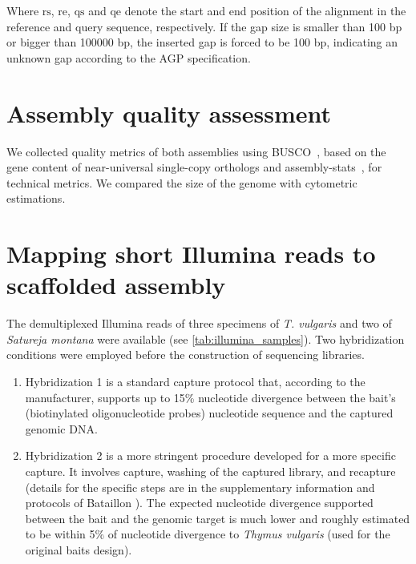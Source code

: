 Where $\textrm{rs}$, $\textrm{re}$, $\textrm{qs}$ and $\textrm{qe}$ denote the start and end position of the alignment in the reference and query sequence, respectively. If the gap size is smaller than 100 bp or bigger than 100000 bp, the inserted gap is forced to be 100 bp, indicating an unknown gap according to the AGP specification.\cite{AGPSpecificationV2} 

\section*{Assembly quality assessment}

We collected quality metrics of both assemblies using BUSCO~\cite{manniBUSCOAssessingGenomic2021}, based on the gene content of near-universal single-copy orthologs and assembly-stats~\cite{Assemblystats2023}, for technical metrics. We compared the size of the genome with cytometric estimations\cite{PlantDNACvalues}. 

\section*{Mapping short Illumina reads to scaffolded assembly}\label{sec:illumina}

The demultiplexed Illumina reads of three specimens of \textit{T. vulgaris} and two of \textit{Satureja montana} were available (see \autoref{tab:illumina_samples}). Two hybridization conditions were employed before the construction of sequencing libraries.\\

\begin{enumerate}
    \item Hybridization 1 is a standard capture protocol that, according to the manufacturer, supports up to 15\% nucleotide divergence between the bait's (biotinylated oligonucleotide probes) nucleotide sequence and the captured genomic DNA. 
    \item Hybridization 2 is a more stringent procedure developed for a more specific capture. It involves capture, washing of the captured library, and recapture (details for the specific steps are in the supplementary information and protocols of Bataillon \etal \cite{bataillonGenotypePhenotypeGenetic2022}). The expected nucleotide divergence supported between the bait and the genomic target is much lower and roughly estimated to be within 5\% of nucleotide divergence to \textit{Thymus vulgaris} (used for the original baits design).
\end{enumerate} 

